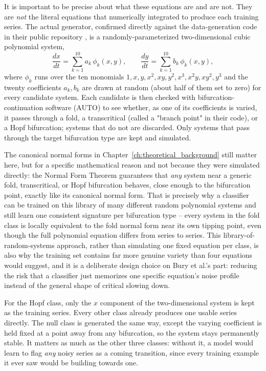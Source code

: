It is important to be precise about what these equations are and are not. They are \emph{not} the literal equations that \citet{bury2021} numerically integrated to produce each training series. The actual generator, confirmed directly against the data-generation code in their public repository \citep{burygithub}, is a randomly-parameterized two-dimensional cubic polynomial system,
\begin{equation}
    \frac{dx}{dt} = \sum_{k=1}^{10} a_k\, \phi_k(x,y), \qquad
    \frac{dy}{dt} = \sum_{k=1}^{10} b_k\, \phi_k(x,y),
\end{equation}
where $\phi_k$ runs over the ten monomials $1, x, y, x^2, xy, y^2, x^3, x^2y, xy^2, y^3$ and the twenty coefficients $a_k, b_k$ are drawn at random (about half of them set to zero) for every candidate system. Each candidate is then checked with bifurcation-continuation software (AUTO) to see whether, as one of its coefficients is varied, it passes through a fold, a transcritical (called a "branch point" in their code), or a Hopf bifurcation; systems that do not are discarded. Only systems that pass through the target bifurcation type are kept and simulated.

The canonical normal forms in Chapter~\ref{ch:theoretical_background} still matter here, but for a specific mathematical reason and not because they were simulated directly: the Normal Form Theorem guarantees that \emph{any} system near a generic fold, transcritical, or Hopf bifurcation behaves, close enough to the bifurcation point, exactly like its canonical normal form. That is precisely why a classifier can be trained on this library of many different random polynomial systems and still learn one consistent signature per bifurcation type -- every system in the fold class is locally equivalent to the fold normal form near its own tipping point, even though the full polynomial equation differs from series to series. This library-of-random-systems approach, rather than simulating one fixed equation per class, is also why the training set contains far more genuine variety than four equations would suggest, and it is a deliberate design choice on Bury et al.'s part: reducing the risk that a classifier just memorizes one specific equation's noise profile instead of the general shape of critical slowing down.

For the Hopf class, only the $x$ component of the two-dimensional system is kept as the training series. Every other class already produces one usable series directly. The null class is generated the same way, except the varying coefficient is held fixed at a point away from any bifurcation, so the system stays permanently stable. It matters as much as the other three classes: without it, a model would learn to flag \emph{any} noisy series as a coming transition, since every training example it ever saw would be building towards one.

